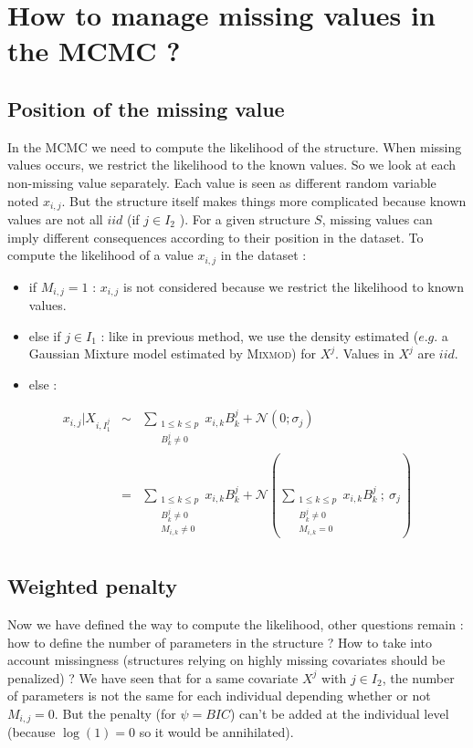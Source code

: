 \documentclass[11pt,a4paper]{report}
\begin{document}
	\section{How to manage missing values in the MCMC ?}
			\subsection{Position of the missing value}

		In the MCMC we need to compute the likelihood of the structure. When missing values occurs, we restrict the likelihood to the known values. So we look at each non-missing value separately. Each value is seen as different random variable noted $x_{i,j}$.  But the structure itself makes things more complicated because known values are not all $iid$ (if $j \in I_2$ ).
			For a given structure $S$, missing values can imply different consequences according to their position in the dataset.
			To compute the likelihood of a value $x_{i,j}$ in the dataset :
			\begin{itemize}
				\item if $M_{i,j}=1$ : $x_{i,j}$ is not considered because we restrict the likelihood to known values.
				\item else if $j \in I_1$ : like in previous method, we use the density estimated  ($e.g.$ a Gaussian Mixture model estimated by \textsc{Mixmod}) for $X^j$. Values in $X^j$ are $iid$.
				\item else :
			\end{itemize}
			\begin{eqnarray}
				x_{i,j}| X_{i,I_1^j} &\sim & \sum_{\substack{1\leq k \leq p \\B_k^j\neq 0 } } x_{i,k}B_k^j  + \mathcal{N}(0;\sigma_j) \\
				&=& \sum_{\substack{1\leq k \leq p \\B_k^j\neq 0 \\ M_{i,k}\neq 0 } } x_{i,k}B_k^j  + \mathcal{N}(\sum_{\substack{1\leq k \leq p \\B_k^j\neq 0 \\ M_{i,k}= 0 } } x_{i,k}B_k^j \ ; \ \sigma_j) \label{Missingdensity}\\ 
			\end{eqnarray}
			
					
			
		\subsection{Weighted penalty}
			Now we have defined the way to compute the likelihood, other questions remain : how to define the number of parameters in the structure ?		How to take into account missingness (structures relying on highly missing covariates should be penalized) ?
			We have seen that for a same covariate $X^j$ with $ j \in I_2$, the number of parameters is not the same for each individual depending whether or not $M_{i,j}=0$. But the penalty (for $\psi=BIC$) can't be added at the individual level (because $\log(1)=0$ so it would be annihilated). 
			
\end{document}
